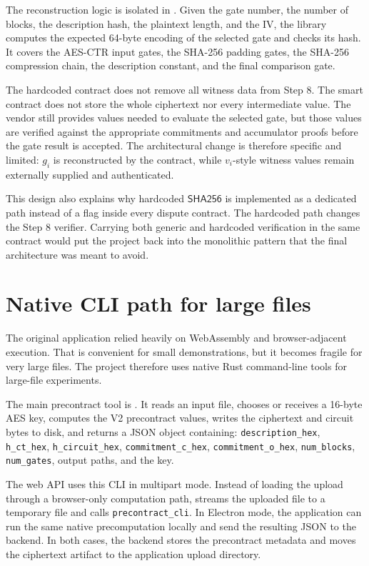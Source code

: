 The reconstruction logic is isolated in
. Given the gate number, the number of blocks, the
description hash, the plaintext length, and the IV, the library computes the expected
64-byte encoding of the selected gate and checks its hash. It covers the AES-CTR input
gates, the SHA-256 padding gates, the SHA-256 compression chain, the description constant,
and the final comparison gate.

The hardcoded contract does not remove all witness data from Step 8. The smart contract
does not store the whole ciphertext nor every intermediate value. The vendor still provides
values needed to evaluate the selected gate, but those values are verified against the
appropriate commitments and accumulator proofs before the gate result is accepted. The
architectural change is therefore specific and limited: \(g_i\) is reconstructed by the
contract, while \(v_i\)-style witness values remain externally supplied and authenticated.

This design also explains why hardcoded \(\mathsf{SHA256}\) is implemented as a dedicated
path instead of a flag inside every dispute contract. The hardcoded path changes the Step 8
verifier. Carrying both generic and hardcoded verification in the same contract would put
the project back into the monolithic pattern that the final architecture was meant to avoid.

\section{Native CLI path for large files}

The original application relied heavily on WebAssembly and browser-adjacent execution. That
is convenient for small demonstrations, but it becomes fragile for very large files. The
project therefore uses native Rust command-line tools for large-file experiments.

The main precontract tool is . It reads an input
file, chooses or receives a 16-byte AES key, computes the V2 precontract values, writes the
ciphertext and circuit bytes to disk, and returns a JSON object containing:
\texttt{description\_hex}, \texttt{h\_ct\_hex}, \texttt{h\_circuit\_hex},
\texttt{commitment\_c\_hex}, \texttt{commitment\_o\_hex}, \texttt{num\_blocks},
\texttt{num\_gates}, output paths, and the key.

The web API uses this CLI in multipart mode. Instead of loading the upload through a
browser-only computation path,  streams the uploaded file to a
temporary file and calls \texttt{precontract\_cli}. In Electron mode, the application can run
the same native precomputation locally and send the resulting JSON to the backend. In both
cases, the backend stores the precontract metadata and moves the ciphertext artifact to the
application upload directory.

